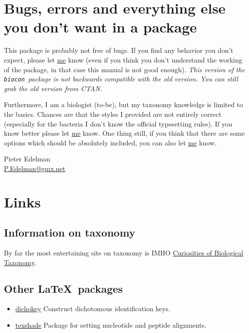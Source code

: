 \documentclass{article}
\newcommand{\biocon}{\texttt{biocon}}
\begin{document}
\section{Bugs, errors and everything else you don't want in a package}\label{sec:Bugs etc.}
This package is probably not free of bugs. If you find any behavior you don't expect, please let \href{mailto:P.Edelman@gmx.net}{me} know (even if you think you don't understand the working of the package, in that case this manual is not good enough). \emph{This version of the \biocon\ package is not backwards compatible with the old version. You can still grab the old version from CTAN.}

Furthermore, I am a biologist (to-be), but my taxonomy knowledge is limited to the basics. Chances are that the styles I provided are not entirely correct (especially for the bacteria I don't know the official typesetting rules). If you know better please let \href{mailto:P.Edelman@gmx.net}{me} know. One thing still, if you think that there are some options which should be absolutely included, you can also let \href{mailto:P.Edelman@gmx.net}{me} know.

Pieter Edelman\\
\href{mailto:P.Edelman@gmx.net}{P.Edelman@gmx.net}

\section{Links}
\subsection{Information on taxonomy}
By far the most entertaining site on taxonomy is IMHO \href{http://www.best.com/~atta/taxonomy.html}{Curiosities of Biological Taxonomy}.
\subsection{Other \LaTeX\ packages}
\begin{itemize}
  \item\href{http://www.ctan.org/tex-archive/macros/latex/contrib/supported/dichokey/}{dichokey} Construct dichotomous identification keys.
  \item\href{http://www.ctan.org/tex-archive/macros/latex/contrib/supported/texshade/}{texshade} Package for setting nucleotide and peptide alignments.
\end{itemize}

\end{document}

